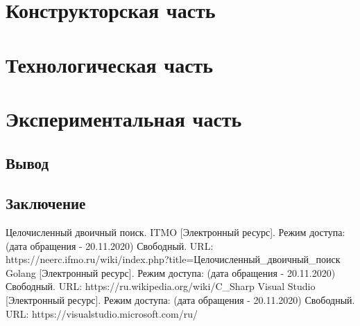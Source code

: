 \documentclass{article}
\begin{document}
	\newpage
	\section{Конструкторская часть}
	
	\newpage
	\section{Технологическая часть}
	

	\newpage
	\section{Экспериментальная часть}
	
	\subsection{Вывод}

	\newpage
	\begin{center}
		\section*{Заключение}
	\end{center}
	\newpage
	
	\begin{center}
	\begin{thebibliography}{3}
	Целочисленный двоичный поиск. ITMO [Электронный ресурс]. Режим доступа: (дата обращения - 20.11.2020) Свободный. URL: https://neerc.ifmo.ru/wiki/index.php?title=Целочисленный\_двоичный\_поиск
	Golang [Электронный ресурс]. Режим доступа: (дата обращения - 20.11.2020) Свободный. URL: https://ru.wikipedia.org/wiki/C\_Sharp
	Visual Studio [Электронный ресурс]. Режим доступа: (дата обращения - 20.11.2020) Свободный. URL: https://visualstudio.microsoft.com/ru/

	\end{thebibliography}
	\end{center}
\end{document}
